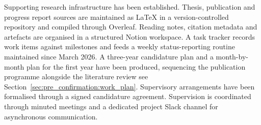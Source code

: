 Supporting research infrastructure has been established.
Thesis, publication and progress report sources are maintained as \LaTeX{} in a version-controlled repository and compiled through Overleaf.
Reading notes, citation metadata and artefacts are organised in a structured Notion workspace.
A task tracker records work items against milestones and feeds a weekly status-reporting routine maintained since March 2026.
A three-year candidature plan and a month-by-month plan for the first year have been produced, sequencing the publication programme alongside the literature review see Section~\ref{sec:pre_confirmation:work_plan}.
Supervisory arrangements have been formalised through a signed candidature agreement.
Supervision is coordinated through minuted meetings and a dedicated project Slack channel for asynchronous communication.